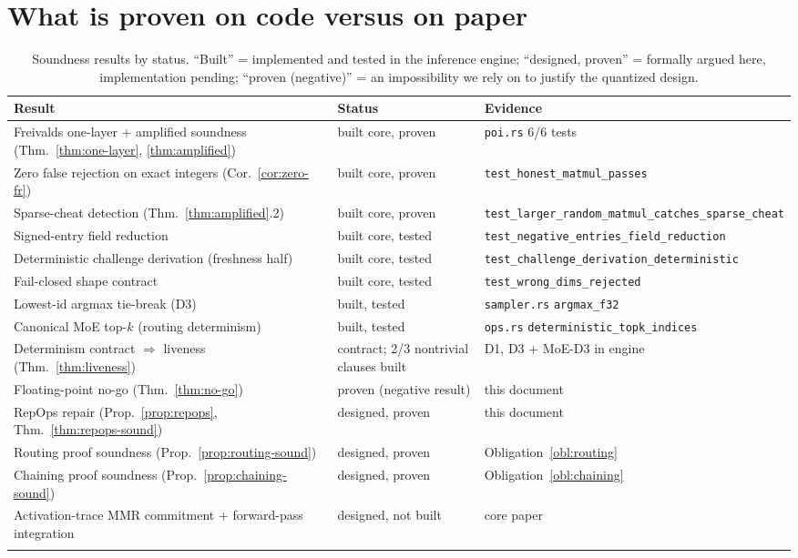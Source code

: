 \documentclass[11pt]{article}
\begin{document}
\section{What is proven on code versus on paper}

\begin{longtable}{@{}p{6.7cm}p{2.6cm}p{4.2cm}@{}}
\toprule
Result & Status & Evidence \\
\midrule
\endhead
Freivalds one-layer + amplified soundness (Thm.~\ref{thm:one-layer}, \ref{thm:amplified})
  & built core, proven
  & \texttt{poi.rs} 6/6 tests \\
Zero false rejection on exact integers (Cor.~\ref{cor:zero-fr})
  & built core, proven
  & \texttt{test\_honest\_matmul\_passes} \\
Sparse-cheat detection (Thm.~\ref{thm:amplified}.2)
  & built core, proven
  & \texttt{test\_larger\_random\_matmul\_catches\_sparse\_cheat} \\
Signed-entry field reduction
  & built core, tested
  & \texttt{test\_negative\_entries\_field\_reduction} \\
Deterministic challenge derivation (freshness half)
  & built core, tested
  & \texttt{test\_challenge\_derivation\_deterministic} \\
Fail-closed shape contract
  & built core, tested
  & \texttt{test\_wrong\_dims\_rejected} \\
Lowest-id argmax tie-break (D3)
  & built, tested
  & \texttt{sampler.rs} \texttt{argmax\_f32} \\
Canonical MoE top-$k$ (routing determinism)
  & built, tested
  & \texttt{ops.rs} \texttt{deterministic\_topk\_indices} \\
Determinism contract $\Rightarrow$ liveness (Thm.~\ref{thm:liveness})
  & contract; 2/3 nontrivial clauses built
  & D1, D3 + MoE-D3 in engine \\
Floating-point no-go (Thm.~\ref{thm:no-go})
  & proven (negative result)
  & this document \\
RepOps repair (Prop.~\ref{prop:repops}, Thm.~\ref{thm:repops-sound})
  & designed, proven
  & this document \\
Routing proof soundness (Prop.~\ref{prop:routing-sound})
  & designed, proven
  & Obligation~\ref{obl:routing} \\
Chaining proof soundness (Prop.~\ref{prop:chaining-sound})
  & designed, proven
  & Obligation~\ref{obl:chaining} \\
Activation-trace MMR commitment + forward-pass integration
  & designed, not built
  & core paper \\
\bottomrule
\caption{Soundness results by status. ``Built'' = implemented and tested in the inference
engine; ``designed, proven'' = formally argued here, implementation pending; ``proven
(negative)'' = an impossibility we rely on to justify the quantized design.}
\end{longtable}
\end{document}
